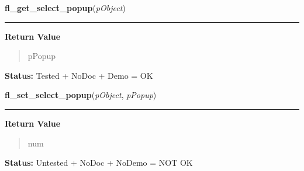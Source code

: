 \hspace{.8\funcindent}\begin{boxedminipage}{\funcwidth}

    \raggedright \textbf{fl\_get\_select\_popup}(\textit{pObject})

    \vspace{-1.5ex}

    \rule{\textwidth}{0.5\fboxrule}
\setlength{\parskip}{2ex}
\setlength{\parskip}{1ex}
      \textbf{Return Value}
    \vspace{-1ex}

      \begin{quote}
      pPopup

      \end{quote}

\textbf{Status:} Tested + NoDoc + Demo = OK



    \end{boxedminipage}

    \label{xformslib:library:fl_set_select_popup}

    \vspace{0.5ex}

\hspace{.8\funcindent}\begin{boxedminipage}{\funcwidth}

    \raggedright \textbf{fl\_set\_select\_popup}(\textit{pObject}, \textit{pPopup})

    \vspace{-1.5ex}

    \rule{\textwidth}{0.5\fboxrule}
\setlength{\parskip}{2ex}
\setlength{\parskip}{1ex}
      \textbf{Return Value}
    \vspace{-1ex}

      \begin{quote}
      num

      \end{quote}

\textbf{Status:} Untested + NoDoc + NoDemo = NOT OK



    \end{boxedminipage}

    \label{xformslib:library:fl_get_select_item}

